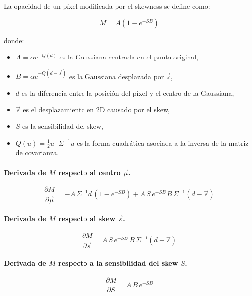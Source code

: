 La opacidad de un píxel modificada por el skewness se define como:

\begin{equation}
M = A \left(1 - e^{-S B} \right)
\end{equation}

donde:
\begin{itemize}
    \item \( A = \alpha e^{-Q(d)} \) es la Gaussiana centrada en el punto original,
    \item \( B = \alpha e^{-Q(d - \vec{s})} \) es la Gaussiana desplazada por \( \vec{s} \),
    \item \( d \) es la diferencia entre la posición del píxel y el centro de la Gaussiana,
    \item \( \vec{s} \) es el desplazamiento en 2D causado por el skew,
    \item \( S \) es la sensibilidad del skew,
    \item \( Q(u) = \frac{1}{2} u^\top \Sigma^{-1} u \) es la forma cuadrática asociada a la inversa de la matriz de covarianza.
\end{itemize}

\paragraph{Derivada de \( M \) respecto al centro \( \vec{\mu} \).}

\begin{equation}
\frac{\partial M}{\partial \vec{\mu}} = -A \, \Sigma^{-1} d \, (1 - e^{-S B}) + A \, S \, e^{-S B} \, B \, \Sigma^{-1}(d - \vec{s})
\end{equation}

\paragraph{Derivada de \( M \) respecto al skew \( \vec{s} \).}

\begin{equation}
\frac{\partial M}{\partial \vec{s}} = A \, S \, e^{-S B} \, B \, \Sigma^{-1}(d - \vec{s})
\end{equation}

\paragraph{Derivada de \( M \) respecto a la sensibilidad del skew \( S \).}

\begin{equation}
\frac{\partial M}{\partial S} = A \, B \, e^{-S B}
\end{equation}

